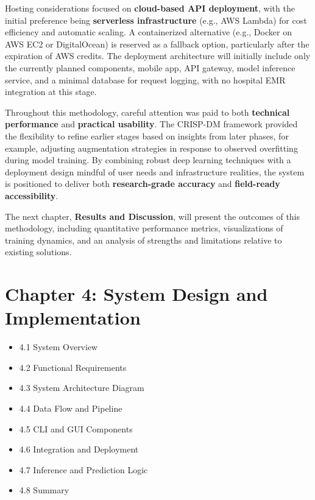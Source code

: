 \documentclass[
  12pt,
  oneside]{article}
\providecommand{\tightlist}{%
  \setlength{\itemsep}{0pt}\setlength{\parskip}{0pt}}
\begin{document}
Hosting considerations focused on \textbf{cloud-based API deployment},
with the initial preference being \textbf{serverless infrastructure}
(e.g., AWS Lambda) for cost efficiency and automatic scaling. A
containerized alternative (e.g., Docker on AWS EC2 or DigitalOcean) is
reserved as a fallback option, particularly after the expiration of AWS
credits. The deployment architecture will initially include only the
currently planned components, mobile app, API gateway, model inference
service, and a minimal database for request logging, with no hospital
EMR integration at this stage.

Throughout this methodology, careful attention was paid to both
\textbf{technical performance} and \textbf{practical usability}. The
CRISP-DM framework provided the flexibility to refine earlier stages
based on insights from later phases, for example, adjusting augmentation
strategies in response to observed overfitting during model training. By
combining robust deep learning techniques with a deployment design
mindful of user needs and infrastructure realities, the system is
positioned to deliver both \textbf{research-grade accuracy} and
\textbf{field-ready accessibility}.

The next chapter, \textbf{Results and Discussion}, will present the
outcomes of this methodology, including quantitative performance
metrics, visualizations of training dynamics, and an analysis of
strengths and limitations relative to existing solutions.

\newpage

\section{Chapter 4: System Design and
Implementation}\label{chapter-4-system-design-and-implementation}

\begin{itemize}
\tightlist
\item
  4.1 System Overview
\item
  4.2 Functional Requirements
\item
  4.3 System Architecture Diagram
\item
  4.4 Data Flow and Pipeline
\item
  4.5 CLI and GUI Components
\item
  4.6 Integration and Deployment
\item
  4.7 Inference and Prediction Logic
\item
  4.8 Summary
\end{itemize}
\end{document}
